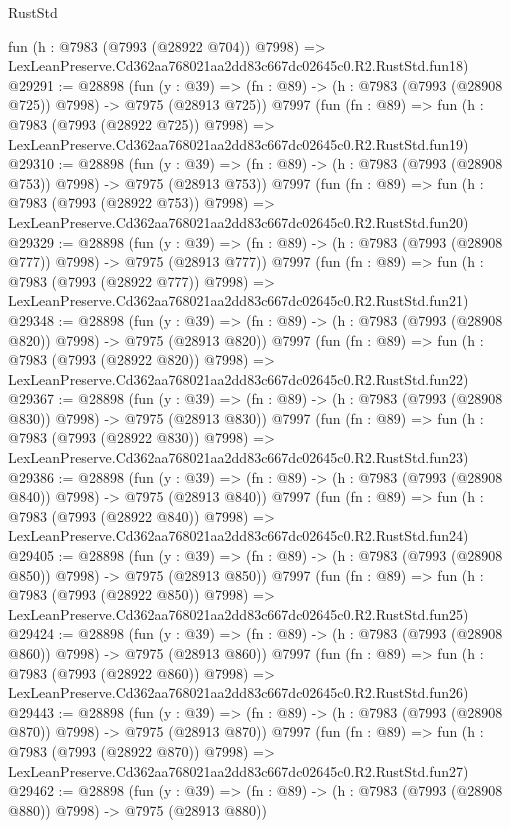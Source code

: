 \begin{lexlean}{RustStd}
\begin{coremodule}
    fun (h : @7983 (@7993 (@28922 @704)) @7998) =>
    LexLeanPreserve.Cd362aa768021aa2dd83c667dc02645c0.R2.RustStd.fun18)
@29291 := @28898
    (fun (y : @39) => (fn : @89) -> (h : @7983 (@7993 (@28908 @725)) @7998) -> @7975 (@28913 @725))
    @7997
    (fun (fn : @89) =>
    fun (h : @7983 (@7993 (@28922 @725)) @7998) =>
    LexLeanPreserve.Cd362aa768021aa2dd83c667dc02645c0.R2.RustStd.fun19)
@29310 := @28898
    (fun (y : @39) => (fn : @89) -> (h : @7983 (@7993 (@28908 @753)) @7998) -> @7975 (@28913 @753))
    @7997
    (fun (fn : @89) =>
    fun (h : @7983 (@7993 (@28922 @753)) @7998) =>
    LexLeanPreserve.Cd362aa768021aa2dd83c667dc02645c0.R2.RustStd.fun20)
@29329 := @28898
    (fun (y : @39) => (fn : @89) -> (h : @7983 (@7993 (@28908 @777)) @7998) -> @7975 (@28913 @777))
    @7997
    (fun (fn : @89) =>
    fun (h : @7983 (@7993 (@28922 @777)) @7998) =>
    LexLeanPreserve.Cd362aa768021aa2dd83c667dc02645c0.R2.RustStd.fun21)
@29348 := @28898
    (fun (y : @39) => (fn : @89) -> (h : @7983 (@7993 (@28908 @820)) @7998) -> @7975 (@28913 @820))
    @7997
    (fun (fn : @89) =>
    fun (h : @7983 (@7993 (@28922 @820)) @7998) =>
    LexLeanPreserve.Cd362aa768021aa2dd83c667dc02645c0.R2.RustStd.fun22)
@29367 := @28898
    (fun (y : @39) => (fn : @89) -> (h : @7983 (@7993 (@28908 @830)) @7998) -> @7975 (@28913 @830))
    @7997
    (fun (fn : @89) =>
    fun (h : @7983 (@7993 (@28922 @830)) @7998) =>
    LexLeanPreserve.Cd362aa768021aa2dd83c667dc02645c0.R2.RustStd.fun23)
@29386 := @28898
    (fun (y : @39) => (fn : @89) -> (h : @7983 (@7993 (@28908 @840)) @7998) -> @7975 (@28913 @840))
    @7997
    (fun (fn : @89) =>
    fun (h : @7983 (@7993 (@28922 @840)) @7998) =>
    LexLeanPreserve.Cd362aa768021aa2dd83c667dc02645c0.R2.RustStd.fun24)
@29405 := @28898
    (fun (y : @39) => (fn : @89) -> (h : @7983 (@7993 (@28908 @850)) @7998) -> @7975 (@28913 @850))
    @7997
    (fun (fn : @89) =>
    fun (h : @7983 (@7993 (@28922 @850)) @7998) =>
    LexLeanPreserve.Cd362aa768021aa2dd83c667dc02645c0.R2.RustStd.fun25)
@29424 := @28898
    (fun (y : @39) => (fn : @89) -> (h : @7983 (@7993 (@28908 @860)) @7998) -> @7975 (@28913 @860))
    @7997
    (fun (fn : @89) =>
    fun (h : @7983 (@7993 (@28922 @860)) @7998) =>
    LexLeanPreserve.Cd362aa768021aa2dd83c667dc02645c0.R2.RustStd.fun26)
@29443 := @28898
    (fun (y : @39) => (fn : @89) -> (h : @7983 (@7993 (@28908 @870)) @7998) -> @7975 (@28913 @870))
    @7997
    (fun (fn : @89) =>
    fun (h : @7983 (@7993 (@28922 @870)) @7998) =>
    LexLeanPreserve.Cd362aa768021aa2dd83c667dc02645c0.R2.RustStd.fun27)
@29462 := @28898
    (fun (y : @39) => (fn : @89) -> (h : @7983 (@7993 (@28908 @880)) @7998) -> @7975 (@28913 @880))

\end{coremodule}
\end{lexlean}
